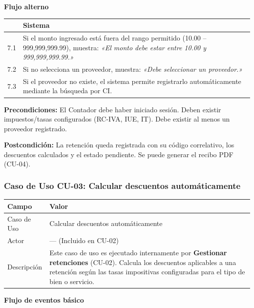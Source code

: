 \documentclass[stu]{apa7}
\begin{document}
\vspace{0.3cm}

\textbf{Flujo alterno}

\begin{tabularx}{\textwidth}{|c|X|}
\hline
& \textbf{Sistema} \\
\hline
7.1 & Si el monto ingresado está fuera del rango permitido (10.00 -- 999,999,999.99), muestra: \textit{«El monto debe estar entre 10.00 y 999,999,999.99.»} \\
\hline
7.2 & Si no selecciona un proveedor, muestra: \textit{«Debe seleccionar un proveedor.»} \\
\hline
7.3 & Si el proveedor no existe, el sistema permite registrarlo automáticamente mediante la búsqueda por CI. \\
\hline
\end{tabularx}

\vspace{0.3cm}

\textbf{Precondiciones:} El Contador debe haber iniciado sesión. Deben existir impuestos/tasas configurados (RC-IVA, IUE, IT). Debe existir al menos un proveedor registrado.

\textbf{Postcondición:} La retención queda registrada con su código correlativo, los descuentos calculados y el estado pendiente. Se puede generar el recibo PDF (CU-04).

\newpage

\subsubsection{Caso de Uso CU-03: Calcular descuentos automáticamente}

\begin{tabularx}{\textwidth}{|l|X|}
\hline
\rowcolor[gray]{0.9}
\textbf{Campo} & \textbf{Valor} \\
\hline
Caso de Uso & Calcular descuentos automáticamente \\
\hline
Actor & --- (Incluido en CU-02) \\
\hline
Descripción & Este caso de uso es ejecutado internamente por \textbf{Gestionar retenciones} (CU-02). Calcula los descuentos aplicables a una retención según las tasas impositivas configuradas para el tipo de bien o servicio. \\
\hline
\end{tabularx}

\vspace{0.3cm}

\textbf{Flujo de eventos básico}
\end{document}
